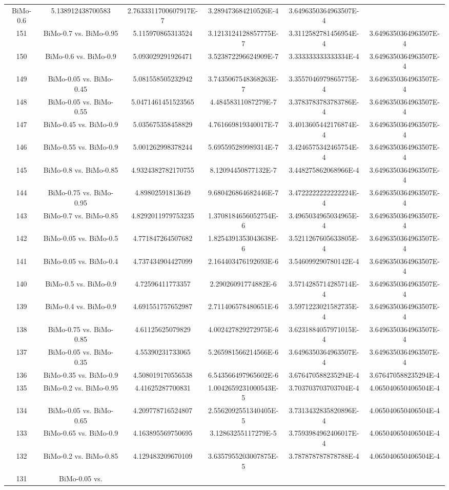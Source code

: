 \documentclass[a4paper,10pt]{article}
\begin{document}
\begin{landscape}
\begin{table}[!htp]
\begin{tabular}{cccccc}
BiMo-0.6&5.138912438700583&2.7633311700607917E-7&3.289473684210526E-4&3.6496350364963507E-4\\151&BiMo-0.7 vs. BiMo-0.95&5.115970865313524&3.1213124128857775E-7&3.3112582781456954E-4&3.6496350364963507E-4\\150&BiMo-0.6 vs. BiMo-0.9&5.093029291926471&3.523872296624909E-7&3.333333333333334E-4&3.6496350364963507E-4\\149&BiMo-0.05 vs. BiMo-0.45&5.081558505232942&3.7435067548368263E-7&3.3557046979865775E-4&3.6496350364963507E-4\\148&BiMo-0.05 vs. BiMo-0.55&5.0471461451523565&4.48458311087279E-7&3.3783783783783786E-4&3.6496350364963507E-4\\147&BiMo-0.45 vs. BiMo-0.9&5.035675358458829&4.761669819340017E-7&3.4013605442176874E-4&3.6496350364963507E-4\\146&BiMo-0.55 vs. BiMo-0.9&5.001262998378244&5.695595289989314E-7&3.4246575342465754E-4&3.6496350364963507E-4\\145&BiMo-0.8 vs. BiMo-0.85&4.9324382782170755&8.12094450877132E-7&3.448275862068966E-4&3.6496350364963507E-4\\144&BiMo-0.75 vs. BiMo-0.95&4.89802591813649&9.680426864682446E-7&3.4722222222222224E-4&3.6496350364963507E-4\\143&BiMo-0.7 vs. BiMo-0.85&4.8292011979753235&1.3708184656052754E-6&3.4965034965034965E-4&3.6496350364963507E-4\\142&BiMo-0.05 vs. BiMo-0.5&4.771847264507682&1.8254391353043638E-6&3.5211267605633805E-4&3.6496350364963507E-4\\141&BiMo-0.05 vs. BiMo-0.4&4.737434904427099&2.164403476192693E-6&3.546099290780142E-4&3.6496350364963507E-4\\140&BiMo-0.5 vs. BiMo-0.9&4.72596411773357&2.29026091774882E-6&3.5714285714285714E-4&3.6496350364963507E-4\\139&BiMo-0.4 vs. BiMo-0.9&4.691551757652987&2.711406578480651E-6&3.5971223021582735E-4&3.6496350364963507E-4\\138&BiMo-0.75 vs. BiMo-0.85&4.61125625079829&4.002427829272975E-6&3.6231884057971015E-4&3.6496350364963507E-4\\137&BiMo-0.05 vs. BiMo-0.35&4.55390231733065&5.265981566214566E-6&3.6496350364963507E-4&3.6496350364963507E-4\\136&BiMo-0.35 vs. BiMo-0.9&4.508019170556538&6.543566497965602E-6&3.676470588235294E-4&3.676470588235294E-4\\135&BiMo-0.2 vs. BiMo-0.95&4.41625287700831&1.0042659231000543E-5&3.703703703703704E-4&4.065040650406504E-4\\134&BiMo-0.05 vs. BiMo-0.65&4.209778716524807&2.5562092551340405E-5&3.7313432835820896E-4&4.065040650406504E-4\\133&BiMo-0.65 vs. BiMo-0.9&4.163895569750695&3.12863255117279E-5&3.7593984962406017E-4&4.065040650406504E-4\\132&BiMo-0.2 vs. BiMo-0.85&4.129483209670109&3.6357955203007875E-5&3.787878787878788E-4&4.065040650406504E-4\\131&BiMo-0.05 vs. 
\end{tabular}
\end{table}
\end{landscape}
\end{document}
